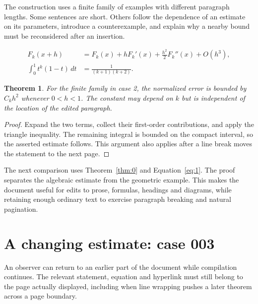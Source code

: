 \documentclass[a4paper,10pt]{article}
\newtheorem{theorem}{Theorem}[section]
\begin{document}
The construction uses a finite family of examples with different paragraph lengths. Some sentences are short. Others follow the dependence of an estimate on its parameters, introduce a counterexample, and explain why a nearby bound must be reconsidered after an insertion.

\lipsum[4-5]
\begin{align}\label{eq:1}
 F_k(x+h)&=F_k(x)+hF_k'(x)+\frac{h^2}{2}F_k''(x)+O(h^3),\\
 \int_0^1 t^k(1-t)\,dt&=\frac{1}{(k+1)(k+2)}.
\end{align}
\begin{theorem}\label{thm:1}
For the finite family in case 2, the normalized error is bounded by $C_k h^2$ whenever $0<h<1$. The constant may depend on $k$ but is independent of the location of the edited paragraph.
\end{theorem}
\begin{proof}
Expand the two terms, collect their first-order contributions, and apply the
triangle inequality. The remaining integral is bounded on the compact interval,
so the asserted estimate follows. This argument also applies after a line break
moves the statement to the next page.
\end{proof}
The next comparison uses Theorem~\ref{thm:0} and Equation~\ref{eq:1}. The proof separates the algebraic estimate from the geometric example. This makes the document useful for edits to prose, formulas, headings and diagrams, while retaining enough ordinary text to exercise paragraph breaking and natural pagination.

\lipsum[8]

\section{A changing estimate: case 003}\label{unit:2}
An observer can return to an earlier part of the document while compilation continues. The relevant statement, equation and hyperlink must still belong to the page actually displayed, including when line wrapping pushes a later theorem across a page boundary.
\end{document}
